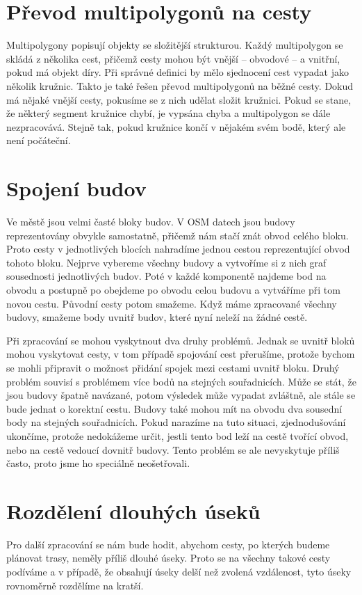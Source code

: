 \section{Převod multipolygonů na cesty}
Multipolygony popisují objekty se složitější strukturou. Každý multipolygon se
skládá z několika cest, přičemž cesty mohou být vnější -- obvodové -- a
vnitřní, pokud má objekt díry. Při správné definici by mělo sjednocení cest
vypadat jako několik kružnic. Takto je také řešen převod multipolygonů na běžné
cesty. Dokud má nějaké vnější cesty, pokusíme se z nich udělat složit kružnici.
Pokud se stane, že některý segment kružnice chybí, je vypsána chyba a
multipolygon se dále nezpracovává. Stejně tak, pokud kružnice končí v nějakém
svém bodě, který ale není počáteční. 

\section{Spojení budov}
Ve městě jsou velmi časté bloky budov. V OSM datech jsou budovy reprezentovány
obvykle samostatně, přičemž nám stačí znát obvod celého bloku. Proto cesty v
jednotlivých blocích nahradíme jednou cestou reprezentující obvod tohoto bloku.
Nejprve vybereme všechny budovy a vytvoříme si z nich graf sousednosti
jednotlivých budov. Poté v každé komponentě najdeme bod na obvodu a postupně
po obejdeme po obvodu celou budovu a vytváříme při tom novou cestu. Původní
cesty potom smažeme. Když máme zpracované všechny budovy, smažeme body uvnitř
budov, které nyní neleží na žádné cestě.

Při zpracování se mohou vyskytnout dva druhy problémů. Jednak se uvnitř bloků
mohou vyskytovat cesty, v tom případě spojování cest přerušíme, protože bychom
se mohli připravit o možnost přidání spojek mezi cestami uvnitř bloku. Druhý
problém souvisí s problémem více bodů na stejných souřadnicích. Může se stát, že
jsou budovy špatně navázané, potom výsledek může vypadat zvláštně, ale stále se
bude jednat o korektní cestu. Budovy také mohou mít na obvodu dva sousední body
na stejných souřadnicích. Pokud narazíme na tuto situaci, zjednodušování
ukončíme, protože nedokážeme určit, jestli tento bod leží na cestě tvořící
obvod, nebo na cestě vedoucí dovnitř budovy. Tento problém se ale nevyskytuje
příliš často, proto jsme ho speciálně neošetřovali.

\section{Rozdělení dlouhých úseků}
Pro další zpracování se nám bude hodit, abychom cesty, po kterých budeme
plánovat trasy, neměly příliš dlouhé úseky. Proto se na všechny takové cesty
podíváme a v případě, že obsahují úseky delší než zvolená vzdálenost, tyto úseky
rovnoměrně rozdělíme na kratší. 

